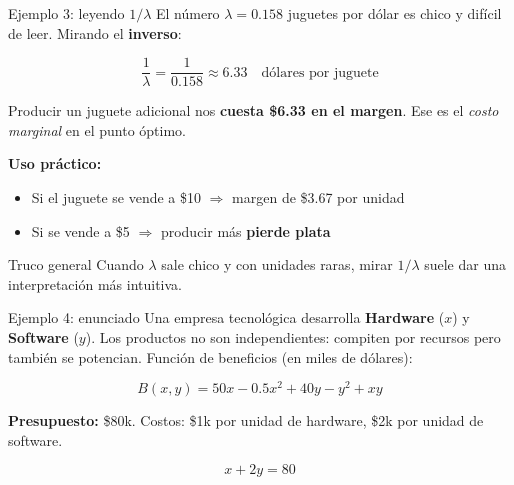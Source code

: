 \documentclass{beamer}
\begin{document}
\begin{frame}{Ejemplo 3: leyendo $1/\lambda$}
    \small
    El número $\lambda = 0.158$ juguetes por dólar es chico y difícil de leer. Mirando el \textbf{inverso}:

    \[
    \frac{1}{\lambda} = \frac{1}{0.158} \approx 6.33 \quad \text{dólares por juguete}
    \]

    \vspace{0.5em}

    Producir un juguete adicional nos \textbf{cuesta \$6.33 en el margen}. Ese es el \textit{costo marginal} en el punto óptimo.

    \vspace{0.5em}

    \textbf{Uso práctico:}
    \begin{itemize}
        \item Si el juguete se vende a \$10 $\Rightarrow$ margen de \$3.67 por unidad
        \item Si se vende a \$5 $\Rightarrow$ producir más \textbf{pierde plata}
    \end{itemize}

    \vspace{0.3em}

    \begin{alertblock}{Truco general}
        Cuando $\lambda$ sale chico y con unidades raras, mirar $1/\lambda$ suele dar una interpretación más intuitiva.
    \end{alertblock}
\end{frame}


\begin{frame}{Ejemplo 4: enunciado}
    \small
    Una empresa tecnológica desarrolla \textbf{Hardware} ($x$) y \textbf{Software} ($y$). Los productos no son independientes: compiten por recursos pero también se potencian. Función de beneficios (en miles de dólares):

    \[
    B(x, y) = 50x - 0.5x^2 + 40y - y^2 + xy
    \]

    \vspace{0.3em}

    \textbf{Presupuesto:} \$80k. Costos: \$1k por unidad de hardware, \$2k por unidad de software.

    \[
    x + 2y = 80
    \]
\end{frame}
\end{document}
